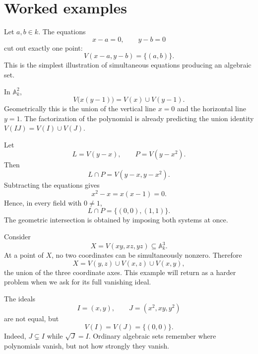
\section{Worked examples}
\label{sec:vi01-worked-examples}

\begin{example}
Let \(a,b\in k\).  The equations
\[
  x-a=0,
  \qquad
  y-b=0
\]
cut out exactly one point:
\[
  V(x-a,y-b)=\{(a,b)\}.
\]
This is the simplest illustration of simultaneous equations producing an algebraic set.
\end{example}

\begin{example}
In \(\mathbb A_k^2\),
\[
  V\bigl(x(y-1)\bigr)=V(x)\cup V(y-1).
\]
Geometrically this is the union of the vertical line \(x=0\) and the horizontal line
\(y=1\).  The factorization of the polynomial is already predicting the union identity
\(V(IJ)=V(I)\cup V(J)\).
\end{example}

\begin{example}
Let
\[
  L=V(y-x),
  \qquad
  P=V(y-x^2).
\]
Then
\[
  L\cap P=V(y-x,y-x^2).
\]
Subtracting the equations gives
\[
  x^2-x=x(x-1)=0.
\]
Hence, in every field with \(0\neq1\),
\[
  L\cap P=\{(0,0),(1,1)\}.
\]
The geometric intersection is obtained by imposing both systems at once.
\end{example}

\begin{example}
Consider
\[
  X=V(xy,xz,yz)\subseteq\mathbb A_k^3.
\]
At a point of \(X\), no two coordinates can be simultaneously nonzero.  Therefore
\[
  X=V(y,z)\cup V(x,z)\cup V(x,y),
\]
the union of the three coordinate axes.  This example will return as a harder problem when
we ask for its full vanishing ideal.
\end{example}

\begin{example}
The ideals
\[
  I=(x,y),
  \qquad
  J=(x^2,xy,y^2)
\]
are not equal, but
\[
  V(I)=V(J)=\{(0,0)\}.
\]
Indeed, \(J\subsetneq I\) while \(\sqrt J=I\).  Ordinary algebraic sets remember where
polynomials vanish, but not how strongly they vanish.
\end{example}

